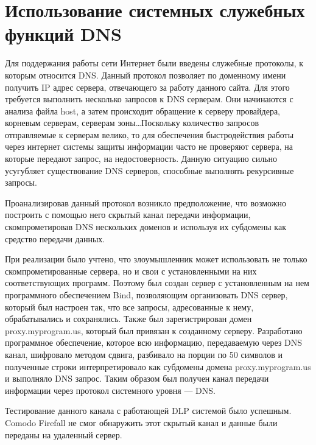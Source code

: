 \section{Использование системных служебных функций DNS}

Для поддержания работы сети Интернет были введены служебные протоколы, к которым относится DNS. Данный протокол позволяет по доменному имени получить IP адрес сервера, отвечающего за работу данного сайта. Для этого требуется выполнить несколько запросов к DNS серверам. Они начинаются с анализа файла host, а затем происходит обращение к серверу провайдера, корневым серверам, серверам зоны\dots Поскольку количество запросов отправляемые к серверам велико, то для обеспечения быстродействия работы через интернет системы защиты информации часто не проверяют сервера, на которые передают запрос, на недостоверность. Данную ситуацию сильно усугубляет существование DNS серверов, способные выполнять рекурсивные запросы. 

Проанализировав данный протокол возникло предположение, что возможно построить с помощью него скрытый канал передачи информации, скомпрометировав DNS нескольких доменов и используя их субдомены как средство передачи данных.

При реализации было учтено, что злоумышленник может использовать не только скомпрометированные сервера, но и свои с установленными на них соответствующих программ. Поэтому был создан сервер с установленным на нем программного обеспечением Bind, позволяющим организовать DNS сервер, который был настроен так, что все запросы, адресованные к нему, обрабатывались и сохранялись. Также был зарегистрирован домен proxy.myprogram.us, который был привязан к созданному серверу. Разработано программное обеспечение, которое всю информацию, передаваемую через DNS канал, шифровало методом сдвига, разбивало на порции по 50 символов и полученные строки интерпретировало как субдомены домена proxy.myprogram.us и выполняло DNS запрос. Таким образом был получен канал передачи информации через протокол системного уровня --- DNS.

Тестирование данного канала с работающей DLP системой было успешным. Comodo Firefall не смог обнаружить этот скрытый канал и данные были переданы на удаленный сервер.
